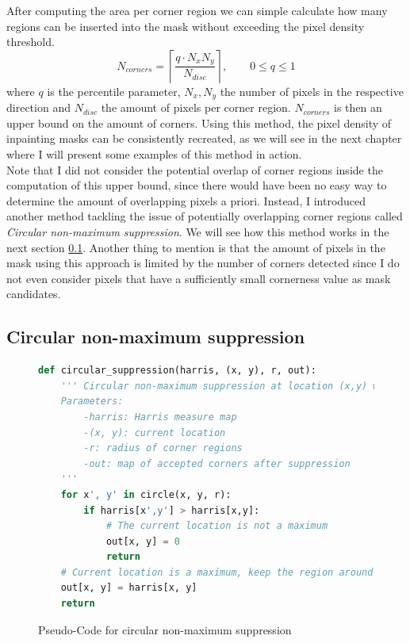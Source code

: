 After computing the area per corner region we can simple calculate how many regions can be inserted
into the mask without exceeding the pixel density threshold.
\begin{equation}
    N_{corners} = \left\lceil \frac{q \cdot N_xN_y}{N_{disc}} \right\rceil,\qquad0\leq q\leq 1 
\end{equation}
where $q$ is the percentile parameter, $N_x, N_y$ the number of pixels in the respective direction
and $N_{disc}$ the amount of pixels per corner region. $N_{corners}$ is then an upper bound on the
amount of corners.
Using this method, the pixel density of inpainting masks can be consistently recreated, as we will
see in the next chapter where I will present some examples of this method in action.\\
Note that I did not consider the potential overlap of corner regions inside the
computation of this upper bound, since there would have been no easy way to determine the amount of
overlapping pixels a priori.
Instead, I introduced another method tackling the issue of potentially overlapping corner regions
called \textit{Circular non-maximum suppression}. We will see how this method
works in the next section \ref{sub:Suppression}.
Another thing to mention is that the amount of pixels in the mask using this approach is limited by
the number of corners detected since I do not even consider pixels that have a sufficiently small
cornerness value as mask candidates.

\subsection{Circular non-maximum suppression}\label{sub:Suppression}
\begin{figure}[t]
    \begin{lstlisting}[language=Python]
def circular_suppression(harris, (x, y), r, out):
    ''' Circular non-maximum suppression at location (x,y) with radius r.
    Parameters:
        -harris: Harris measure map
        -(x, y): current location
        -r: radius of corner regions
        -out: map of accepted corners after suppression
    '''
    for x', y' in circle(x, y, r):
        if harris[x',y'] > harris[x,y]:
            # The current location is not a maximum
            out[x, y] = 0
            return
    # Current location is a maximum, keep the region around it
    out[x, y] = harris[x, y]
    return 
    \end{lstlisting}
    \caption{Pseudo-Code for circular non-maximum suppression}
\end{figure}

